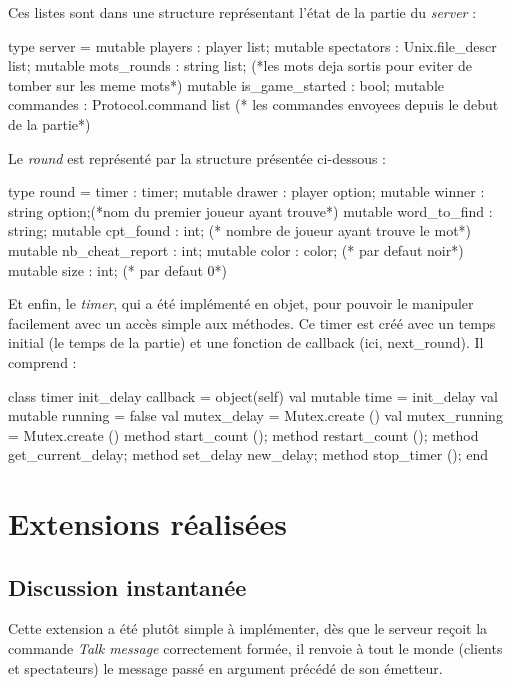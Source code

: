 \documentclass[a4paper, 11pt]{report}
\begin{document}
Ces listes sont dans une structure représentant l'état de la
partie du \emph{server} :

\begin{OCaml}
type server = {
  mutable players : player list;
  mutable spectators : Unix.file_descr list;
  mutable mots_rounds : string list; (*les mots deja sortis pour
  eviter de tomber sur les meme mots*)
  mutable is_game_started : bool;
  mutable commandes : Protocol.command list (* les commandes envoyees
  depuis le debut de la partie*)
}


\end{OCaml}

Le \emph{round} est représenté par la structure présentée
ci-dessous :

\begin{OCaml}
type round = {
  timer : timer;
  mutable drawer : player option;
  mutable winner : string option;(*nom du premier joueur ayant trouve*)
  mutable word_to_find : string;
  mutable cpt_found : int; (* nombre de joueur ayant trouve le mot*)
  mutable nb_cheat_report : int;
  mutable color : color; (* par defaut noir*)
  mutable size : int; (* par defaut 0*)
}
\end{OCaml}

Et enfin, le \emph{timer}, qui a été implémenté en objet, pour pouvoir le 
manipuler facilement avec un accès simple aux méthodes.
Ce timer est créé avec un temps initial (le temps de la partie) et une
fonction de callback (ici, next\_round). Il comprend :
\begin{OCaml}
class timer init_delay callback = 
object(self)
  val mutable time = init_delay 
  val mutable running = false
  val mutex_delay = Mutex.create ()
  val mutex_running = Mutex.create ()
  method start_count ();
  method restart_count ();
  method get_current_delay;
  method set_delay new_delay;
  method stop_timer ();
end
\end{OCaml}

\section{Extensions réalisées}

\subsection{Discussion instantanée}

Cette extension a été plutôt simple à implémenter, dès que le serveur
reçoit la commande \emph{Talk message} correctement formée, il renvoie
à tout le monde (clients et spectateurs) le message passé en argument
précédé de son émetteur. 
\end{document}
